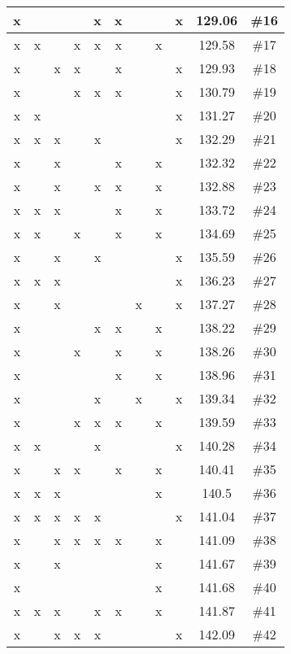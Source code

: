 \begin{center}
\begin{longtable}{|c|c|c|c|c|c|c|c|c|c|c|}
 x &  &  &  &  x &  x &  &  &  x & 129.06 & \#16 \\ \hline
 x &  x &  &  x &  x &  x &  &  x &  & 129.58 & \#17 \\ \hline
 x &  &  x &  x &  &  x &  &  &  x & 129.93 & \#18 \\ \hline
 x &  &  &  x &  x &  x &  &  &  x & 130.79 & \#19 \\ \hline
 x &  x &  &  &  &  &  &  &  x & 131.27 & \#20 \\ \hline
 x &  x &  x &  &  x &  &  &  &  x & 132.29 & \#21 \\ \hline
 x &  &  x &  &  &  x &  &  x &  & 132.32 & \#22 \\ \hline
 x &  &  x &  &  x &  x &  &  x &  & 132.88 & \#23 \\ \hline
 x &  x &  x &  &  &  x &  &  x &  & 133.72 & \#24 \\ \hline
 x &  x &  &  x &  &  x &  &  x &  & 134.69 & \#25 \\ \hline
 x &  &  x &  &  x &  &  &  &  x & 135.59 & \#26 \\ \hline
 x &  x &  x &  &  &  &  &  &  x & 136.23 & \#27 \\ \hline
 x &  &  x &  &  &  &  x &  &  x & 137.27 & \#28 \\ \hline
 x &  &  &  &  x &  x &  &  x &  & 138.22 & \#29 \\ \hline
 x &  &  &  x &  &  x &  &  x &  & 138.26 & \#30 \\ \hline
 x &  &  &  &  &  x &  &  x &  & 138.96 & \#31 \\ \hline
 x &  &  &  &  x &  &  x &  &  x & 139.34 & \#32 \\ \hline
 x &  &  &  x &  x &  x &  &  x &  & 139.59 & \#33 \\ \hline
 x &  x &  &  &  x &  &  &  &  x & 140.28 & \#34 \\ \hline
 x &  &  x &  x &  &  x &  &  x &  & 140.41 & \#35 \\ \hline
 x &  x &  x &  &  &  &  &  x &  & 140.5 & \#36 \\ \hline
 x &  x &  x &  x &  x &  &  &  &  x & 141.04 & \#37 \\ \hline
 x &  &  x &  x &  x &  x &  &  x &  & 141.09 & \#38 \\ \hline
 x &  &  x &  &  &  &  &  x &  & 141.67 & \#39 \\ \hline
 x &  &  &  &  &  &  &  x &  & 141.68 & \#40 \\ \hline
 x &  x &  x &  &  x &  x &  &  x &  & 141.87 & \#41 \\ \hline
 x &  &  x &  x &  x &  &  &  &  x & 142.09 & \#42 \\ \hline

\end{longtable}
\end{center}
